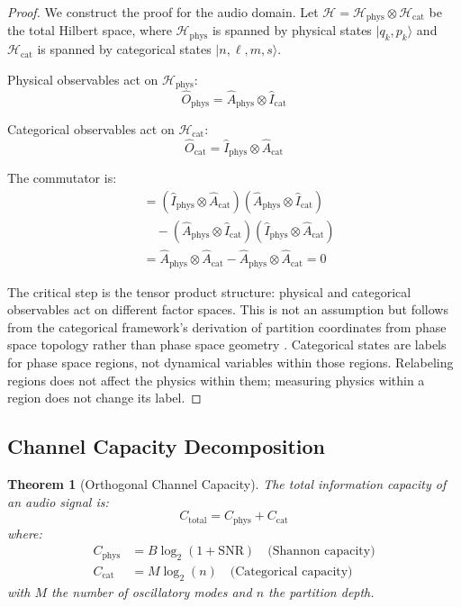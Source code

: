 \documentclass[twocolumn,10pt]{article}
\newtheorem{theorem}{Theorem}[section]
\theoremstyle{remark}
\newcommand{\Ocat}{\hat{O}_{\mathrm{cat}}}
\newcommand{\Ophys}{\hat{O}_{\mathrm{phys}}}
\newcommand{\Ccat}{C_{\mathrm{cat}}}
\newcommand{\Cphys}{C_{\mathrm{phys}}}
\newcommand{\calH}{\mathcal{H}}
\begin{document}
\begin{proof}
We construct the proof for the audio domain. Let $\calH = \calH_{\mathrm{phys}} \otimes \calH_{\mathrm{cat}}$ be the total Hilbert space, where $\calH_{\mathrm{phys}}$ is spanned by physical states $|q_k, p_k\rangle$ and $\calH_{\mathrm{cat}}$ is spanned by categorical states $|n, \ell, m, s\rangle$.

Physical observables act on $\calH_{\mathrm{phys}}$:
\begin{equation}
    \Ophys = \hat{A}_{\mathrm{phys}} \otimes \hat{I}_{\mathrm{cat}}
\end{equation}

Categorical observables act on $\calH_{\mathrm{cat}}$:
\begin{equation}
    \Ocat = \hat{I}_{\mathrm{phys}} \otimes \hat{A}_{\mathrm{cat}}
\end{equation}

The commutator is:
\begin{align}
    [\Ocat, \Ophys] &= (\hat{I}_{\mathrm{phys}} \otimes \hat{A}_{\mathrm{cat}})(\hat{A}_{\mathrm{phys}} \otimes \hat{I}_{\mathrm{cat}}) \nonumber \\
    &\quad - (\hat{A}_{\mathrm{phys}} \otimes \hat{I}_{\mathrm{cat}})(\hat{I}_{\mathrm{phys}} \otimes \hat{A}_{\mathrm{cat}}) \nonumber \\
    &= \hat{A}_{\mathrm{phys}} \otimes \hat{A}_{\mathrm{cat}} - \hat{A}_{\mathrm{phys}} \otimes \hat{A}_{\mathrm{cat}} = 0
\end{align}

The critical step is the tensor product structure: physical and categorical observables act on different factor spaces. This is not an assumption but follows from the categorical framework's derivation of partition coordinates from phase space topology rather than phase space geometry \cite{sachikonye2026counting}. Categorical states are labels for phase space regions, not dynamical variables within those regions. Relabeling regions does not affect the physics within them; measuring physics within a region does not change its label.
\end{proof}

\subsection{Channel Capacity Decomposition}

\begin{theorem}[Orthogonal Channel Capacity]
\label{thm:channel_capacity}
The total information capacity of an audio signal is:
\begin{equation}
    C_{\mathrm{total}} = \Cphys + \Ccat
    \label{eq:total_capacity}
\end{equation}
where:
\begin{align}
    \Cphys &= B \log_2(1 + \mathrm{SNR}) \quad \text{(Shannon capacity)} \label{eq:Cphys} \\
    \Ccat &= M \log_2(n) \quad \text{(Categorical capacity)} \label{eq:Ccat}
\end{align}
with $M$ the number of oscillatory modes and $n$ the partition depth.
\end{theorem}
\end{document}
